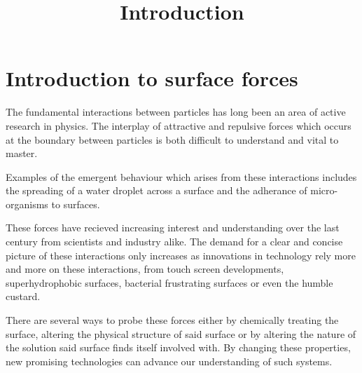 

\chapter{Introduction to surface forces}





 
\title{Introduction}

The fundamental interactions between particles has long been an area of active research in physics. The interplay of attractive and repulsive forces which occurs at the boundary between particles is both difficult to understand and vital to master.

Examples of the emergent behaviour which arises from these interactions includes the spreading of a water droplet across a surface and the adherance of micro-organisms to surfaces.

These forces
have
recieved increasing interest and understanding over the last century
from scientists and industry alike. The demand for a clear and concise picture of these interactions only increases as innovations in technology rely more and more on these interactions, from touch screen developments, 
superhydrophobic surfaces, bacterial frustrating surfaces or even the humble custard. 

There are several ways to 
probe these forces 
either by chemically treating the surface, altering the physical structure of said surface or by altering the
nature of the 
solution said surface finds itself involved with. By changing these properties, new promising technologies can 
advance our understanding of such 
systems.

